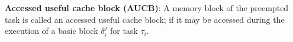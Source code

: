 
\begin{definition}
\textbf{Accessed useful cache block (AUCB)}: A memory block of the preempted task is called an accessed useful cache block; if it may be accessed during the execution of a basic block \begin{math}\delta_{i}^{j}\end{math} for task \begin{math}\tau_{i}\end{math}.
\end{definition}

